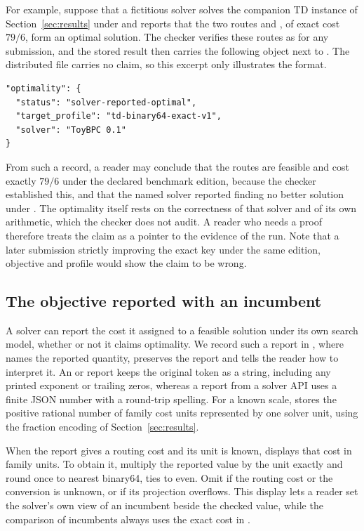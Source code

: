 For example, suppose that a fictitious solver  solves the companion TD instance of Section~\ref{sec:results} under  and reports that the two routes \id{[1]} and \id{[2]}, of exact cost $79/6$, form an optimal solution. The checker verifies these routes as for any submission, and the stored result then carries the following object next to . The distributed file  carries no claim, so this excerpt only illustrates the format.
\begin{verbatim}
"optimality": {
  "status": "solver-reported-optimal",
  "target_profile": "td-binary64-exact-v1",
  "solver": "ToyBPC 0.1"
}
\end{verbatim}
From such a record, a reader may conclude that the routes are feasible and cost exactly $79/6$ under the declared benchmark edition, because the checker established this, and that the named solver reported finding no better solution under . The optimality itself rests on the correctness of that solver and of its own arithmetic, which the checker does not audit. A reader who needs a proof therefore treats the claim as a pointer to the evidence of the run. Note that a later submission strictly improving the exact key under the same edition, objective and profile would show the claim to be wrong.

\subsection*{The objective reported with an incumbent}

A solver can report the cost it assigned to a feasible solution under its own search model, whether or not it claims optimality. We record such a report in , where  names the reported quantity,  preserves the report and  tells the reader how to interpret it. An  or  report keeps the original token as a string, including any printed exponent or trailing zeros, whereas a  report from a solver API uses a finite JSON number with a round-trip spelling. For a known scale,  stores the positive rational number of family cost units represented by one solver unit, using the fraction encoding of Section~\ref{sec:results}.

When the report gives a routing cost and its unit is known,  displays that cost in family units. To obtain it, multiply the reported value by the unit exactly and round once to nearest binary64, ties to even. Omit  if the routing cost or the conversion is unknown, or if its projection overflows. This display lets a reader set the solver's own view of an incumbent beside the checked value, while the comparison of incumbents always uses the exact cost in .

